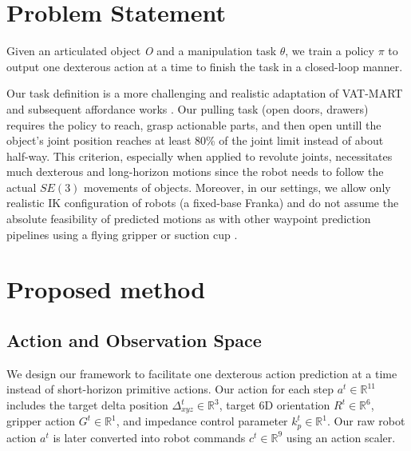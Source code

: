 \section{Problem Statement}
\label{sec:overview}


Given an articulated object \textit{O} and a manipulation task \textit{$\theta$}, we train a policy \textit{$\pi$} to output one dexterous action at a time to finish the task in a closed-loop manner. 

Our task definition is a more challenging and realistic adaptation of VAT-MART\cite{vatmart} and subsequent affordance works  \cite{where2act,where2explore}. Our pulling task (open doors, drawers) requires the policy to reach, grasp actionable parts, and then open untill the object's joint position reaches at least 80\% of the joint limit instead of about half-way\cite{vatmart,rgbmanip}. This criterion, especially when applied to revolute joints, necessitates much dexterous and long-horizon motions since the robot needs to follow the actual $SE(3)$ movements of objects. Moreover, in our settings, we allow only realistic IK configuration of robots (a fixed-base Franka) and do not assume the absolute feasibility of predicted motions as with other waypoint prediction pipelines using a flying gripper or suction cup \cite{where2act,where2explore,umpnet}. 

\section{Proposed method}

\subsection{Action and Observation Space} \label{method:spaces}
We design our framework to facilitate one dexterous action prediction at a time instead of short-horizon primitive actions. Our action for each step $a^t \in \mathbb{R}^{11}$ includes the target delta position $\Delta^t_{xyz} \in \mathbb{R}^3$, target 6D orientation $R^t \in \mathbb{R}^6$, gripper action $G^t \in \mathbb{R}^1$, and impedance control parameter $k_p^t \in \mathbb{R}^1$. Our raw robot action $a^t$ is later converted into robot commands $c^t \in \mathbb{R}^9 $ using an action scaler.

